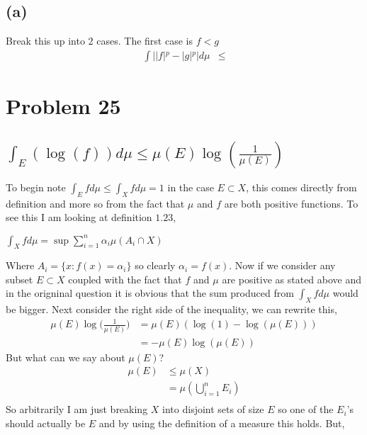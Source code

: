 \documentclass[12pt]{article}
\begin{document}
\subsection*{(a)}
Break this up into 2 cases. The first case is $f < g$
\begin{align*}
\int ||f|^{p}-|g|^{p}|d\mu &\leq
\end{align*}

\section*{Problem 25}
\subsection*{$\int_{E}(\log(f))d\mu \leq \mu(E)\log(\frac{1}{\mu(E)})$}
To begin note $\int_{E}fd\mu \leq \int_{X}fd\mu = 1$ in the case $E
\subset X$, this comes directly from definition and more so from the
fact that $\mu$ and $f$ are both positive functions. To see this I am
looking at definition $1.23$,
\begin{center}
$\int_{X}fd\mu = \sup \sum_{i=1}^{n}\alpha_{i}\mu (A_{i}\cap X)$
\end{center}
Where $A_{i}= \{x : f(x) = \alpha_{i}\}$ so clearly
$\alpha_{i}=f(x)$. Now if we consider any subset $E \subset X$ coupled
with the fact that $f$ and $\mu$ are positive as stated above and in
the origninal question it is obvious that the sum produced from
$\int_{X}fd\mu$ would be bigger. Next consider the right side of the
inequality, we can rewrite this,
\begin{align*}
\mu(E)\log\bigg(\frac{1}{\mu(E)}\bigg) &=\mu(E)(\log(1)-\log(\mu(E)))\\
&=-\mu(E)\log(\mu(E))
\end{align*}
But what can we say about $\mu(E)$? 
\begin{align*}
\mu(E) &\leq \mu(X)\\ 
&= \mu(\bigcup_{i=1}^{n}E_{i})\\
\end{align*}
So arbitrarily I am just breaking $X$ into disjoint sets of size $E$ so one of
the $E_{i}$'s should actually be $E$ and by using the definition of a
measure this holds. But,
\end{document}
